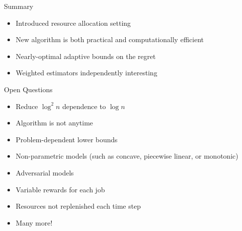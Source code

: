 \documentclass[nofooter,scale=1.4]{poster}
\begin{document}
\begin{frame}
\begin{textblock}{25.33}
\begin{block}{Summary}
\begin{itemize}
\item Introduced resource allocation setting
\item New algorithm is both practical and computationally efficient
\item Nearly-optimal adaptive bounds on the regret
\item Weighted estimators independently interesting
\end{itemize}
\end{block}

\begin{block}{Open Questions}
\begin{itemize}
\item Reduce $\log^2 n$ dependence to $\log n$
\item Algorithm is not anytime
\item Problem-dependent lower bounds
\item Non-parametric models (such as concave, piecewise linear, or monotonic)
\item Adversarial models
\item Variable rewards for each job
\item Resources not replenished each time step
\item Many more!
\end{itemize}
\end{block}

\end{textblock}




\end{frame}
\end{document}
